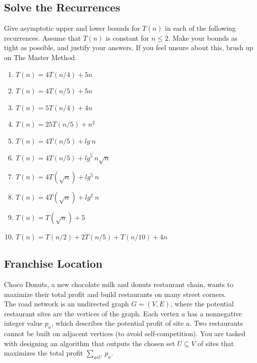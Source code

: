 \documentclass[12pt]{amsart}
\begin{document}
\subsection{Solve the Recurrences} 
Give asymptotic upper and lower bounds for $T(n)$ in each of the following recurrences. Assume
that $T(n)$ is constant for $n \leq 2$. Make your bounds as tight as possible, and justify your answers. 
If you feel unsure about this, brush up on The Master Method.
\begin{enumerate}[label=(\alph*)]
\item $T(n) = 4T(n/4) + 5n$
\item $ T(n) = 4T(n/5) + 5n$
\item $T(n) = 5T(n/4) + 4n$
\item $T(n) = 25T(n/5) + n^2$
\item $T(n) = 4T(n/5) + lg \: n$
\item $T(n) = 4T(n/5) + lg^5 \: n \sqrt n$
\item $T(n) = 4T(\sqrt n) + lg^5 \: n$
\item $T(n) = 4T(\sqrt n) + lg^2 \: n$
\item $T(n) = T(\sqrt n) + 5$
\item $ T(n) = T(n/2) + 2T(n/5) + T(n/10) + 4n$
\end{enumerate} 

\subsection{Franchise Location} 
Choco Donuts, a new chocolate milk and donuts restaurant chain, wants to maximize their total profit and build restaurants on many street corners. 
\\

The road network is an undirected graph $G = (V, E)$, where the potential restaurant
sites are the vertices of the graph. Each vertex $a$ has a nonnegative integer value $p_a$, which describes the potential profit of site $a$. Two restaurants cannot be built on adjacent vertices (to avoid self-competition). You are tasked with designing an algorithm that outputs the chosen set $U \subseteq V$ of sites that maximizes the total profit $\sum _{a \epsilon U} \: p_a$.
\\
\end{document}

